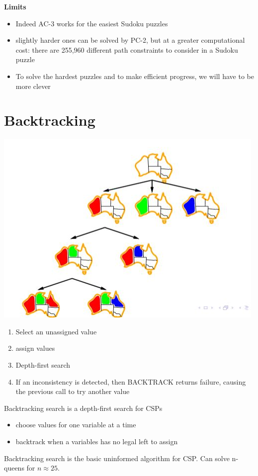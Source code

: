 \textbf{Limits}
\begin{itemize}
\item Indeed AC-3 works for the easiest Sudoku puzzles
\item slightly harder ones can be solved by PC-2, but at a greater computational cost: there are 255,960 
different path constraints to consider in a Sudoku puzzle
\item To solve the hardest puzzles and to make efficient progress, we will have to be more clever 

\end{itemize}

\section{Backtracking}
\includegraphics[scale=1]{chap1_pics/backtracking.jpeg} 

\begin{enumerate}
\item Select an unassigned value
\item assign values
\item Depth-first search
\item If an inconsistency is detected, then BACKTRACK returns failure, causing the previous call to try another value
\end{enumerate}

Backtracking search is a depth-first search for CSPs
\begin{itemize}
\item choose values for one variable at a time
\item backtrack when a variables has no legal left to assign
\end{itemize}
Backtracking search is the basic uninformed algorithm for CSP.
Can solve n-queens for $n\approx 25.$

